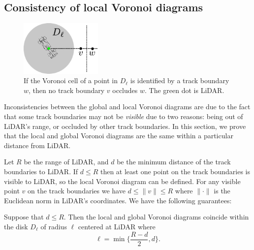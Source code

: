 \subsection{Consistency of local Voronoi diagrams}
\label{sec:localVoronoi}

\begin{figure}
\centering
\includegraphics[width=4cm]{Figures/voronoi_occlusion.pdf}
\caption{If the Voronoi cell of a point in $D_\ell$ is identified by a track boundary $w$, then no track boundary $v$ occludes $w$. The green dot is LiDAR.}
\label{fig:voronoi-global-to-local}
\end{figure}

Inconsistencies between the global and local Voronoi diagrams are due to the fact that some track boundaries may not be \emph{visible} due to two reasons: being out of LiDAR's range, or occluded by other track boundaries.
%
In this section, we prove that the local and global Voronoi diagrams are the same within a particular distance from LiDAR.

Let $R$ be the range of LiDAR, 
and $d$ be the minimum distance of the track boundaries to LiDAR.
%
If $d \leq R$ then at least one point on the track boundaries is visible to LiDAR, so the local Voronoi diagram can be defined.
%
For any visible point $v$ on the track boundaries we have $d \leq \lVert v \rVert \leq R$ where $ \lVert \cdot \rVert $ is the Euclidean norm in LiDAR's coordinates.
%
We have the following guarantees:
\begin{theorem}
Suppose that $d \leq R$.
%
Then the local and global Voronoi diagrams coincide within the disk $D_\ell$ of radius $\ell$ centered at LiDAR where
$$
\ell = \min \{ \frac{R-d}{2}, d \}.
$$
\label{thm:voronoi}
\end{theorem}

